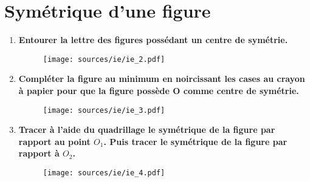 \documentclass[11pt]{article}
\begin{document}
\section{Symétrique d'une figure}
\begin{multicols}{2}
  \begin{enumerate}
  \item \textbf{Entourer la lettre des figures possédant un centre de symétrie.}

    \begin{figure}[H]
      \centering
      \texttt{[image: sources/ie/ie\_2.pdf]}
    \end{figure}

  \item \textbf{Compléter la figure au minimum en noircissant les cases au crayon à papier pour que la figure possède O comme centre de symétrie.}

    \begin{figure}[H]
      \centering
      \texttt{[image: sources/ie/ie\_3.pdf]}
    \end{figure}

  \item \textbf{Tracer à l'aide du quadrillage le symétrique de la figure par rapport au point $O_1$.  Puis tracer le symétrique de la figure par rapport à $O_2$.}

    \begin{figure}[H]
      \centering
      \texttt{[image: sources/ie/ie\_4.pdf]}
    \end{figure}
  \end{enumerate}
\end{multicols}
\end{document}
